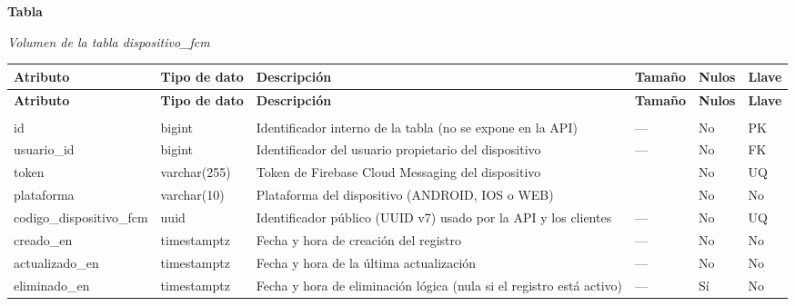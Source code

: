 \label{tab:volumen_dispositivo_fcm}
\noindent\textbf{Tabla~\thetable}\par\nopagebreak
\noindent\textit{Volumen de la tabla dispositivo\_\allowbreak{}fcm}\par\nopagebreak
\begingroup\small\linespread{1}\selectfont\setlength{\tabcolsep}{4pt}
\begin{longtable}{>{\raggedright\arraybackslash}p{3.4cm} >{\raggedright\arraybackslash}p{2.5cm} >{\raggedright\arraybackslash}p{4.8cm} >{\centering\arraybackslash}p{1.6cm}>{\centering\arraybackslash}p{1.1cm} >{\centering\arraybackslash}p{1.3cm}}
\toprule
\textbf{Atributo} & \textbf{Tipo de dato} & \textbf{Descripción} & \textbf{Tamaño} & \textbf{Nulos} & \textbf{Llave} \\
\midrule
\endfirsthead
\toprule
\textbf{Atributo} & \textbf{Tipo de dato} & \textbf{Descripción} & \textbf{Tamaño} & \textbf{Nulos} & \textbf{Llave} \\
\midrule
\endhead
\endfoot
\bottomrule
\multicolumn{6}{l}{\textit{Nota.} Elaboración propia.} \\
\endlastfoot
id & bigint & Identificador interno de la tabla (no se expone en la API) & — & No & PK \\
usuario\_\allowbreak{}id & bigint & Identificador del usuario propietario del dispositivo & — & No & FK \\
token & varchar(255) & Token de Firebase Cloud Messaging del dispositivo & 255 & No & UQ \\
plataforma & varchar(10) & Plataforma del dispositivo (ANDROID, IOS o WEB) & 10 & No & No \\
codigo\_\allowbreak{}dispositivo\_\allowbreak{}fcm & uuid & Identificador público (UUID v7) usado por la API y los clientes & — & No & UQ \\
creado\_\allowbreak{}en & timestamptz & Fecha y hora de creación del registro & — & No & No \\
actualizado\_\allowbreak{}en & timestamptz & Fecha y hora de la última actualización & — & No & No \\
eliminado\_\allowbreak{}en & timestamptz & Fecha y hora de eliminación lógica (nula si el registro está activo) & — & Sí & No \\
\end{longtable}
\endgroup
\addtocounter{table}{-1}

